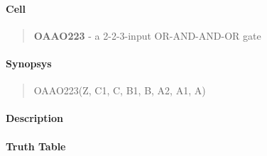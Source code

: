 \label{OAAO223}
\paragraph{Cell}
\begin{quote}
    \textbf{OAAO223} - a 2-2-3-input OR-AND-AND-OR gate
\end{quote}

\paragraph{Synopsys}
\begin{quote}
    OAAO223(Z, C1, C, B1, B, A2, A1, A)
\end{quote}

\paragraph{Description}

%

\paragraph{Truth Table}
%

